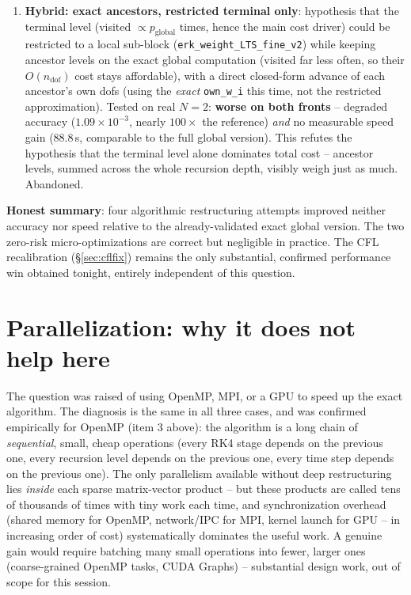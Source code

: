 \documentclass[11pt]{article}
\begin{document}
\begin{enumerate}
  per call), measured \textbf{much slower}
  ($N{=}1$: $18$--$26$\,s versus $0.67$\,s serial) -- the per-call
  synchronization cost vastly exceeds the work being parallelized,
  since this function is called tens of thousands of times with tiny
  work each time. Abandoned (source reverted, kept as a comment).
  \item \textbf{Hybrid: exact ancestors, restricted terminal only}:
  hypothesis that the terminal level (visited $\propto p_{\text{global}}$
  times, hence the main cost driver) could be restricted to a local
  sub-block (\texttt{erk\_weight\_LTS\_fine\_v2}) while keeping ancestor
  levels on the exact global computation (visited far less often, so
  their $O(n_{\text{dof}})$ cost stays affordable), with a direct
  closed-form advance of each ancestor's own dofs (using the
  \emph{exact} \texttt{own\_w\_i} this time, not the restricted
  approximation). Tested on real $N=2$: \textbf{worse on both fronts} --
  degraded accuracy ($1.09\times10^{-3}$, nearly $100\times$ the
  reference) \emph{and} no measurable speed gain ($88.8$\,s, comparable
  to the full global version). This refutes the hypothesis that the
  terminal level alone dominates total cost -- ancestor levels,
  summed across the whole recursion depth, visibly weigh just as much.
  Abandoned.
\end{enumerate}

\textbf{Honest summary}: four algorithmic restructuring attempts
improved neither accuracy nor speed relative to the already-validated
exact global version. The two zero-risk micro-optimizations are
correct but negligible in practice. The CFL recalibration
(\S\ref{sec:cflfix}) remains the only substantial, confirmed
performance win obtained tonight, entirely independent of this
question.

\section{Parallelization: why it does not help here}
\label{sec:parallel}

The question was raised of using OpenMP, MPI, or a GPU to speed up the
exact algorithm. The diagnosis is the same in all three cases, and was
confirmed empirically for OpenMP (item 3 above): the algorithm is a
long chain of \emph{sequential}, small, cheap operations (every RK4
stage depends on the previous one, every recursion level depends on
the previous one, every time step depends on the previous one). The
only parallelism available without deep restructuring lies
\emph{inside} each sparse matrix-vector product -- but these products
are called tens of thousands of times with tiny work each time, and
synchronization overhead (shared memory for OpenMP, network/IPC for
MPI, kernel launch for GPU -- in increasing order of cost)
systematically dominates the useful work. A genuine gain would require
batching many small operations into fewer, larger ones (coarse-grained
OpenMP tasks, CUDA Graphs) -- substantial design work, out of scope
for this session.
\end{document}
